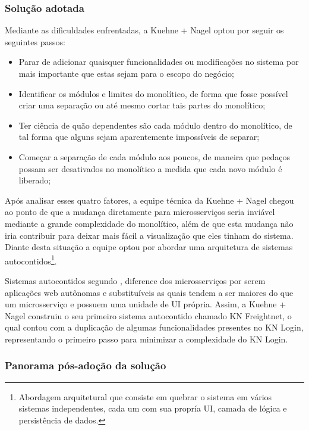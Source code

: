 \subsubsection{Solução adotada}

Mediante as dificuldades enfrentadas, a Kuehne + Nagel optou por seguir os seguintes passos:

\begin{itemize}
    \item Parar de adicionar quaisquer funcionalidades ou modificações no sistema por mais
        importante que estas sejam para o escopo do negócio;
    \item Identificar os módulos e limites do monolítico, de forma que fosse possível criar uma
        separação ou até mesmo cortar tais partes do monolítico;
    \item Ter ciência de quão dependentes são cada módulo dentro do monolítico, de tal forma que
        alguns sejam aparentemente impossíveis de separar;
    \item Começar a separação de cada módulo aos poucos, de maneira que pedaços possam ser
        desativados no monolítico a medida que cada novo módulo é liberado;
\end{itemize}

Após analisar esses quatro fatores, a equipe técnica da Kuehne + Nagel chegou ao ponto de que a
mudança diretamente para microsserviços seria inviável mediante a grande complexidade do monolítico,
além de que esta mudança não iria contribuir para deixar mais fácil a visualização que eles
tinham do sistema. Diante desta situação a equipe optou por abordar uma arquitetura de sistemas
autocontidos\footnote{Abordagem arquitetural que consiste em quebrar o sistema em vários sistemas
independentes, cada um com sua propría \gls{UI}, camada de lógica e persistência de dados.}.

Sistemas autocontidos segundo , diference dos
microsserviços por serem aplicações web autônomas e substituíveis as quais tendem a ser maiores do
que um microsserviço e possuem uma unidade de \gls{UI} própria. Assim, a Kuehne + Nagel construiu o
seu primeiro sistema autocontido chamado KN Freightnet, o qual contou com a duplicação de algumas
funcionalidades presentes no KN Login, representando o primeiro passo para minimizar a complexidade
do KN Login.

\subsubsection{Panorama pós-adoção da solução}

